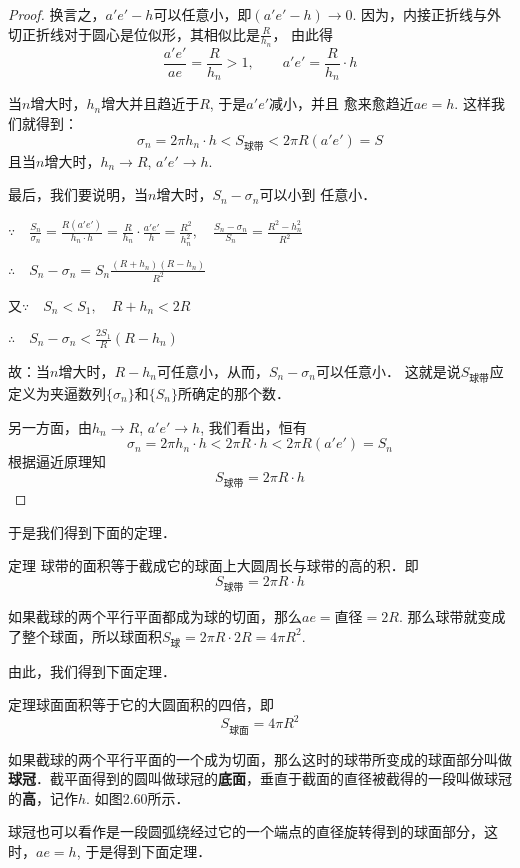\begin{proof}
换言之，$a'e'-h$可以任意小，即$(a'e'-h)\to 0$. 因为，内接正折线与外切正折线对于圆心是位似形，其相似比是$\frac{R}{h_n}$，
由此得
\[\frac{a'e'}{ae}=\frac{R}{h_n}>1,\qquad a'e'=\frac{R}{h_n}\cdot h\]

当$n$增大时，$h_n$增大并且趋近于$R$, 于是$a'e'$减小，并且
愈来愈趋近$ae=h$. 这样我们就得到：
\[\sigma_n=2\pi h_n\cdot h<S_{\text{球带}}<2\pi R(a'e')=S\]
且当$n$增大时，$h_n\to R$, $a'e'\to h$.

最后，我们要说明，当$n$增大时，$S_n-\sigma_n$可以小到
任意小．

$\because\quad \frac{S_n}{\sigma_n}=\frac{R(a'e')}{h_n\cdot h}=\frac{R}{h_n}\cdot \frac{a'e'}{h}=\frac{R^2}{h^2_n},\quad \frac{S_n-\sigma_n}{S_n}=\frac{R^2-h^2_n}{R^2}$

$\therefore\quad S_n-\sigma_n=S_n\frac{(R+h_n) (R-h_n)}{R^2}$

又$\because\quad S_n<S_1,\quad R+h_n<2R$

$\therefore\quad S_n-\sigma_n<\frac{2S_1}{R}(R-h_n)$

故：当$n$增大时，$R-h_n$可任意小，从而，$S_n -\sigma_n$可以任意小．
这就是说$S_{\text{球带}}$应定义为夹逼数列$\{\sigma_n\}$和$\{S_n \}$所确定的那个数．

另一方面，由$h_n\to R$, $a'e'\to h$, 我们看出，恒有
\[\sigma_n=2\pi h_n\cdot h<2\pi R\cdot h<2\pi R (a'e') =S_n\]
根据逼近原理知
$$S_{\text{球带}}=2\pi R\cdot h$$
\end{proof}

于是我们得到下面的定理．

\begin{blk}
    {定理} 球带的面积等于截成它的球面上大圆周长与球带的高的积．即
\[S_{\text{球带}}=2\pi R\cdot h\]
\end{blk}

如果截球的两个平行平面都成为球的切面，那么$ae=$直径$=2R$. 那么球带就变成了整个球面，所以球面积$S_{\text{球}}=2\pi R\cdot 2R=4\pi R^2$.

由此，我们得到下面定理．

\begin{blk}
    {定理}球面面积等于它的大圆面积的四倍，即
\[S_{\text{球面}}=4\pi R^2\]
\end{blk}

如果截球的两个平行平面的一个成为切面，那么这时的球带所变成的球面部分叫做\textbf{球冠}．截平面得到的圆叫做球冠的\textbf{底面}，垂直于截面的直径被截得的一段叫做球冠的\textbf{高}，记作$h$. 如图2.60所示．

球冠也可以看作是一段圆弧绕经过它的一个端点的直径旋转得到的球面部分，这时，$ae=h$, 于是得到下面定理．


